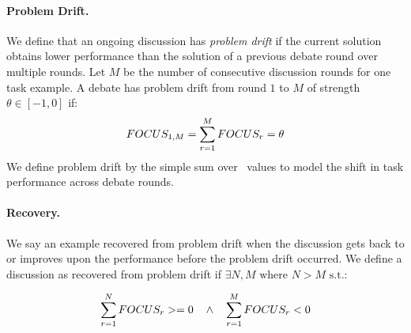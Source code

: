 \paragraph{\textbf{Problem Drift.}}
We define that an ongoing discussion has \textit{problem drift} if the current solution obtains lower performance than the solution of a previous debate round over multiple rounds.
Let $M$ be the number of consecutive discussion rounds for one task example.
A debate has problem drift from round $1$ to $M$ of strength $\theta \in [-1,0]$ if:
\begin{equation} \label{def:drift}
\small
FOCUS_{1,M} = \sum_{r=1}^{M} FOCUS_r = \theta
\end{equation}
We define problem drift by the simple sum over \metric\ values to model the shift in task performance across debate rounds.

\paragraph{\textbf{Recovery.}}
We say an example recovered from problem drift when the discussion gets back to or improves upon the performance before the problem drift occurred.
We define a discussion as recovered from problem drift if $\exists N,M \text{ where } N > M \text{ s.t.}$:



\vspace*{-4mm}
\begin{equation} \label{def:recovery}
    \small
    \sum_{r=1}^{N} FOCUS_r >= 0 \quad \wedge \quad \sum_{r=1}^{M} FOCUS_r < 0
\end{equation}